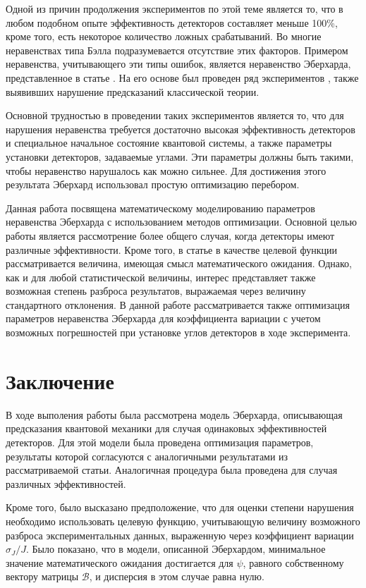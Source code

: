 \documentclass[11pt]{article}
\begin{document}
Одной из причин продолжения экспериментов по этой теме является то, что в любом подобном опыте эффективность детекторов составляет меньше 100\%, кроме того, есть некоторое количество ложных срабатываний. Во многие неравенствах типа Бэлла подразумевается отсутствие этих факторов. Примером неравенства, учитывающего эти типы ошибок, является неравенство Эберхарда, представленное в статье \cite{Eberhard}. На его основе был проведен ряд экспериментов \cite{Zeilinger}, также выявивших нарушение предсказаний классической теории.

Основной трудностью в проведении таких экспериментов является то, что для нарушения неравенства требуется достаточно высокая эффективность детекторов и специальное начальное состояние квантовой системы, а также параметры установки детекторов, задаваемые углами. Эти параметры должны быть такими, чтобы неравенство нарушалось как можно сильнее. Для достижения этого результата Эберхард использовал простую оптимизацию перебором.

Данная работа посвящена математическому моделированию параметров неравенства Эберхарда с использованием методов оптимизации. Основной целью работы является рассмотрение более общего случая, когда детекторы имеют различные эффективности. Кроме того, в статье \cite{Eberhard} в качестве целевой функции рассматривается величина, имеющая смысл математического ожидания. Однако, как и для любой статистической величины, интерес представляет также возможная степень разброса результатов, выражаемая через величину стандартного отклонения. В данной работе рассматривается также оптимизация параметров неравенства Эберхарда для коэффициента вариации с учетом возможных погрешностей при установке углов детекторов в ходе эксперимента.

\section*{Заключение}
В ходе выполения работы была рассмотрена модель Эберхарда, описывающая предсказания квантовой механики для случая одинаковых эффективностей детекторов. Для этой модели была проведена оптимизация параметров, результаты которой согласуются с аналогичными результатами из рассматриваемой статьи. Аналогичная процедура была проведена для случая различных эффективностей.

Кроме того, было высказано предположение, что для оценки степени нарушения необходимо использовать целевую функцию, учитывающую величину возможного разброса экспериментальных данных, выраженную через коэффициент вариации $\sigma_J / J$. Было показано, что в модели, описанной Эберхардом, минимальное значение математического ожидания достигается для $\psi$, равного собственному вектору матрицы $\mathcal{B}$, и дисперсия в этом случае равна нулю.
\end{document}
